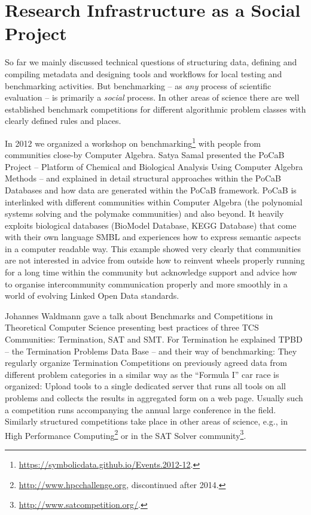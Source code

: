 \documentclass[a4paper,11pt]{article}
\begin{document}
\section{Research Infrastructure as a Social Project}

So far we mainly discussed technical questions of structuring data, defining
and compiling metadata and designing tools and workflows for local testing and
benchmarking activities.  But benchmarking -- as \emph{any} process of
scientific evaluation -- is primarily a \emph{social} process.  In other areas
of science there are well established benchmark competitions for different
algorithmic problem classes with clearly defined rules and places.

In 2012 we organized a workshop on
benchmarking\footnote{\url{https://symbolicdata.github.io/Events.2012-12}.}
with people from communities close-by Computer Algebra.  Satya Samal presented
the PoCaB Project -- Platform of Chemical and Biological Analysis Using
Computer Algebra Methods -- and explained in detail structural approaches
within the PoCaB Databases and how data are generated within the PoCaB
framework.  PoCaB is interlinked with different communities within Computer
Algebra (the polynomial systems solving and the polymake communities) and also
beyond. It heavily exploits biological databases (BioModel Database, KEGG
Database) that come with their own language SMBL and experiences how to express
semantic aspects in a computer readable way. This example showed very clearly
that communities are not interested in advice from outside how to reinvent
wheels properly running for a long time within the community but acknowledge
support and advice how to organise intercommunity communication properly and
more smoothly in a world of evolving Linked Open Data standards.

Johannes Waldmann gave a talk about Benchmarks and Competitions in Theoretical
Computer Science presenting best practices of three TCS Communities:
Termination, SAT and SMT. For Termination he explained TPBD -- the Termination
Problems Data Base -- and their way of benchmarking: They regularly organize
Termination Competitions on previously agreed data from different problem
categories in a similar way as the “Formula I” car race is organized: Upload
tools to a single dedicated server that runs all tools on all problems and
collects the results in aggregated form on a web page. Usually such a
competition runs accompanying the annual large conference in the field.
Similarly structured competitions take place in other areas of science, e.g.,
in High Performance Computing\footnote{\url{http://www.hpcchallenge.org},
  discontinued after 2014.} or in the SAT Solver
community\footnote{\url{http://www.satcompetition.org/}.}.
\end{document}
